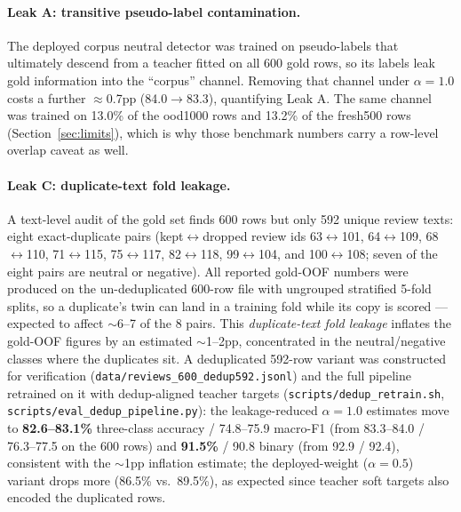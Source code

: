 \documentclass[11pt,a4paper]{article}
\newcommand{\code}[1]{\texttt{#1}}
\begin{document}
\paragraph{Leak A: transitive pseudo-label contamination.} The
deployed corpus neutral detector was trained on pseudo-labels that
ultimately descend from a teacher fitted on all 600 gold rows, so its
labels leak gold information into the ``corpus'' channel. Removing
that channel under $\alpha=1.0$ costs a further $\approx$0.7pp
(84.0$\to$83.3), quantifying Leak A. The same channel was trained on
13.0\% of the ood1000 rows and 13.2\% of the fresh500 rows
(Section~\ref{sec:limits}), which is why those benchmark numbers
carry a row-level overlap caveat as well.

\paragraph{Leak C: duplicate-text fold leakage.} A text-level audit of
the gold set finds 600 rows but only 592 unique review texts: eight
exact-duplicate pairs (kept$\leftrightarrow$dropped review ids
63$\leftrightarrow$101, 64$\leftrightarrow$109, 68$\leftrightarrow$110,
71$\leftrightarrow$115, 75$\leftrightarrow$117, 82$\leftrightarrow$118,
99$\leftrightarrow$104, and 100$\leftrightarrow$108; seven of the eight
pairs are neutral or negative). All reported gold-OOF numbers were
produced on the un-deduplicated 600-row file with ungrouped stratified
5-fold splits, so a duplicate's twin can land in a training fold while
its copy is scored --- expected to affect $\sim$6--7 of the 8 pairs.
This \emph{duplicate-text fold leakage} inflates the gold-OOF figures
by an estimated $\sim$1--2pp, concentrated in the neutral/negative
classes where the duplicates sit. A deduplicated 592-row variant was
constructed for verification (\code{data/reviews\_600\_dedup592.jsonl})
and the full pipeline retrained on it with dedup-aligned teacher
targets (\code{scripts/dedup\_retrain.sh},
\code{scripts/eval\_dedup\_pipeline.py}): the leakage-reduced
$\alpha{=}1.0$ estimates move to \textbf{82.6--83.1\%} three-class
accuracy / 74.8--75.9 macro-F1 (from 83.3--84.0 / 76.3--77.5 on the
600 rows) and \textbf{91.5\%} / 90.8 binary (from 92.9 / 92.4),
consistent with the $\sim$1pp inflation estimate; the deployed-weight
($\alpha{=}0.5$) variant drops more (86.5\% vs.\ 89.5\%), as expected
since teacher soft targets also encoded the duplicated rows.
\end{document}
